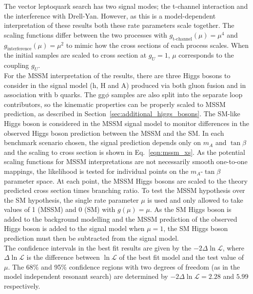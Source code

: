 The vector leptoquark search has two signal modes; the t-channel interaction and the interference with Drell-Yan. 
However, as this is a model-dependent interpretation of these results both these rate parameters scale together.
The scaling functions differ between the two processes with $g_{\text{t-channel}}(\mu) = \mu^4$ and $g_{\text{interference}}(\mu) = \mu^2$ to mimic how the cross sections of each process scales.
When the initial samples are scaled to cross section at $g_{U}=1$, $\mu$ corresponds to the coupling $g_{U}$. \\

For the MSSM interpretation of the results, there are three Higgs bosons to consider in the signal model (h, H and A) produced via both gluon fusion and in association with b quarks.
The gg$\phi$ samples are also split into the separate loop contributors, so the kinematic properties can be properly scaled to MSSM prediction, as described in Section~\ref{sec:additional_higgs_bosons}.
The SM-like Higgs boson is considered in the MSSM signal model to monitor differences in the observed Higgs boson prediction between the MSSM and the SM.
In each benchmark scenario chosen, the signal prediction depends only on $m_{A}$ and $\tan\beta$ and the scaling to cross section is shown in Eq.~\ref{eqn:mssm_xs}.
As the potential scaling functions for MSSM interpretations are not necessarily smooth one-to-one mappings, the likelihood is tested for individual points on the $m_{A}$-$\tan\beta$ parameter space.
At each point, the MSSM Higgs bosons are scaled to the theory predicted cross section times branching ratio.
To test the MSSM hypothesis over the SM hypothesis, the single rate parameter $\mu$ is used and only allowed to take values of 1 (MSSM) and 0 (SM) with $g(\mu)=\mu$.
As the SM Higgs boson is added to the background modelling and the MSSM prediction of the observed Higgs boson is added to the signal model when $\mu=1$, the SM Higgs boson prediction must then be subtracted from the signal model. \\

The confidence intervals in the best fit results are given by the $-2\Delta\ln\mathcal{L}$, where $\Delta\ln\mathcal{L}$ is the difference between $\ln\mathcal{L}$ of the best fit model and the test value of $\mu$. 
The 68\% and 95\% confidence regions with two degrees of freedom (as in the model independent resonant search) are determined by $-2\Delta\ln\mathcal{L} = 2.28$ and $5.99$ respectively. \\

